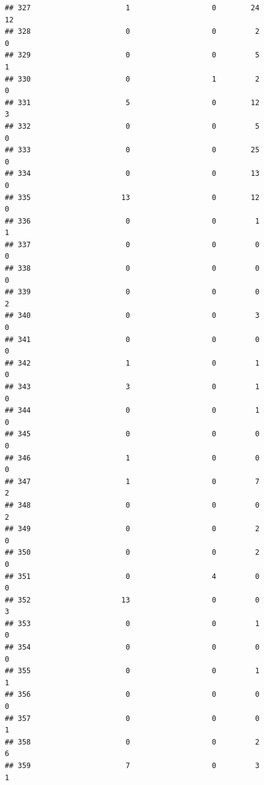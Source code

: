 \documentclass[
]{article}
\begin{document}
\begin{verbatim}
## 327                      1                   0        24                 12
## 328                      0                   0         2                  0
## 329                      0                   0         5                  1
## 330                      0                   1         2                  0
## 331                      5                   0        12                  3
## 332                      0                   0         5                  0
## 333                      0                   0        25                  0
## 334                      0                   0        13                  0
## 335                     13                   0        12                  0
## 336                      0                   0         1                  1
## 337                      0                   0         0                  0
## 338                      0                   0         0                  0
## 339                      0                   0         0                  2
## 340                      0                   0         3                  0
## 341                      0                   0         0                  0
## 342                      1                   0         1                  0
## 343                      3                   0         1                  0
## 344                      0                   0         1                  0
## 345                      0                   0         0                  0
## 346                      1                   0         0                  0
## 347                      1                   0         7                  2
## 348                      0                   0         0                  2
## 349                      0                   0         2                  0
## 350                      0                   0         2                  0
## 351                      0                   4         0                  0
## 352                     13                   0         0                  3
## 353                      0                   0         1                  0
## 354                      0                   0         0                  0
## 355                      0                   0         1                  1
## 356                      0                   0         0                  0
## 357                      0                   0         0                  1
## 358                      0                   0         2                  6
## 359                      7                   0         3                  1

\end{verbatim}
\end{document}
